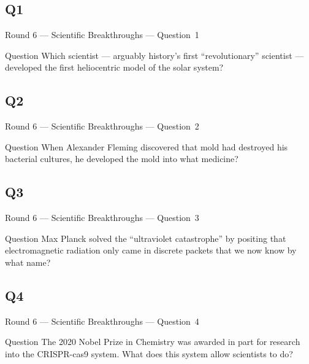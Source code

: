 \documentclass[11pt]{beamer}
\begin{document}
\subsection*{Q1}
\begin{frame}[t]{Round 6 --- Scientific Breakthroughs --- \mbox{Question 1}}
\vspace{-0.5em}
\begin{block}{Question}
Which scientist --- arguably history's first ``revolutionary'' scientist --- developed the first heliocentric model of the solar system?
\end{block}
\end{frame}
\subsection*{Q2}
\begin{frame}[t]{Round 6 --- Scientific Breakthroughs --- \mbox{Question 2}}
\vspace{-0.5em}
\begin{block}{Question}
When Alexander Fleming discovered that mold had destroyed his bacterial cultures, he developed the mold into what medicine?
\end{block}
\end{frame}
\subsection*{Q3}
\begin{frame}[t]{Round 6 --- Scientific Breakthroughs --- \mbox{Question 3}}
\vspace{-0.5em}
\begin{block}{Question}
Max Planck solved the ``ultraviolet catastrophe'' by positing that electromagnetic radiation only came in discrete packets that we now know by what name?
\end{block}
\end{frame}
\subsection*{Q4}
\begin{frame}[t]{Round 6 --- Scientific Breakthroughs --- \mbox{Question 4}}
\vspace{-0.5em}
\begin{block}{Question}
The 2020 Nobel Prize in Chemistry was awarded in part for research into the CRISPR-cas9 system. What does this system allow scientists to do?
\end{block}
\end{frame}
\end{document}
